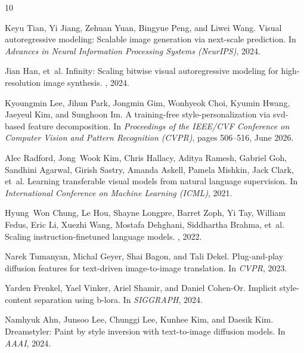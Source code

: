 \documentclass[10pt,twocolumn,letterpaper]{article}
\begin{document}
{\small

\begin{thebibliography}{10}

Keyu Tian, Yi Jiang, Zehuan Yuan, Bingyue Peng, and Liwei Wang.
\newblock Visual autoregressive modeling: Scalable image generation via next-scale prediction.
\newblock In {\em Advances in Neural Information Processing Systems (NeurIPS)}, 2024.

Jian Han, et~al.
\newblock Infinity: Scaling bitwise visual autoregressive modeling for high-resolution image synthesis.
, 2024.

Kyoungmin Lee, Jihun Park, Jongmin Gim, Wonhyeok Choi, Kyumin Hwang, Jaeyeul Kim, and Sunghoon Im.
\newblock A training-free style-personalization via svd-based feature decomposition.
\newblock In {\em Proceedings of the IEEE/CVF Conference on Computer Vision and Pattern Recognition (CVPR)}, pages 506--516, June 2026.

Alec Radford, Jong~Wook Kim, Chris Hallacy, Aditya Ramesh, Gabriel Goh, Sandhini Agarwal, Girish Sastry, Amanda Askell, Pamela Mishkin, Jack Clark, et~al.
\newblock Learning transferable visual models from natural language supervision.
\newblock In {\em International Conference on Machine Learning (ICML)}, 2021.

Hyung~Won Chung, Le Hou, Shayne Longpre, Barret Zoph, Yi Tay, William Fedus, Eric Li, Xuezhi Wang, Mostafa Dehghani, Siddhartha Brahma, et~al.
\newblock Scaling instruction-finetuned language models.
, 2022.

Narek Tumanyan, Michal Geyer, Shai Bagon, and Tali Dekel.
\newblock Plug-and-play diffusion features for text-driven image-to-image translation.
\newblock In {\em CVPR}, 2023.

Yarden Frenkel, Yael Vinker, Ariel Shamir, and Daniel Cohen-Or.
\newblock Implicit style-content separation using b-lora.
\newblock In {\em SIGGRAPH}, 2024.

Namhyuk Ahn, Junsoo Lee, Chunggi Lee, Kunhee Kim, and Daesik Kim.
\newblock Dreamstyler: Paint by style inversion with text-to-image diffusion models.
\newblock In {\em AAAI}, 2024.

\end{thebibliography}
}
\end{document}
